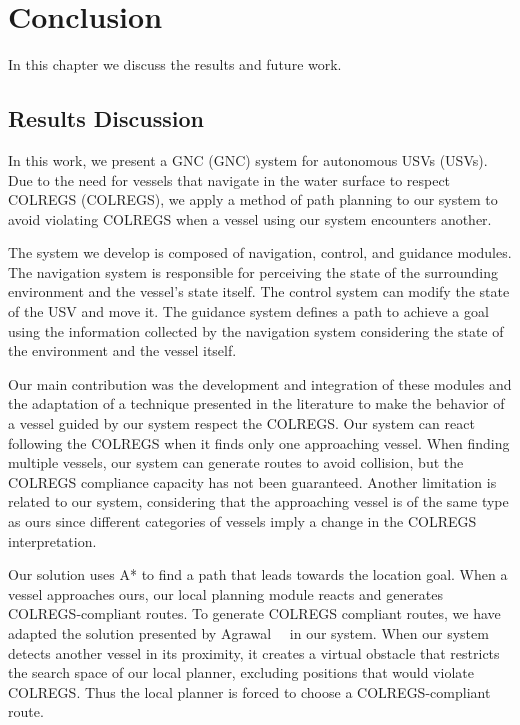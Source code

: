 \chapter{Conclusion}
\label{chap:6_Conclusion}

    In this chapter we discuss the results and future work.
    
    \section{Results Discussion}

    In this work, we present a \acl{GNC} (\ac{GNC}) system for autonomous \aclp{USV} (\acp{USV}). Due to the need for vessels that navigate in the water surface to respect \acl{COLREGS} (\ac{COLREGS}), we apply a method of path planning to our system to avoid violating \ac{COLREGS} when a vessel using our system encounters another.

    The system we develop is composed of navigation, control, and guidance modules. The navigation system is responsible for perceiving the state of the surrounding environment and the vessel's state itself. The control system can modify the state of the \ac{USV} and move it. The guidance system defines a path to achieve a goal using the information collected by the navigation system considering the state of the environment and the vessel itself.
    
    Our main contribution was the development and integration of these modules and the adaptation of a technique presented in the literature to make the behavior of a vessel guided by our system respect the \ac{COLREGS}. Our system can react following the \ac{COLREGS} when it finds only one approaching vessel. When finding multiple vessels, our system can generate routes to avoid collision, but the \ac{COLREGS} compliance capacity has not been guaranteed. Another limitation is related to our system, considering that the approaching vessel is of the same type as ours since different categories of vessels imply a change in the \ac{COLREGS} interpretation.
    
    Our solution uses A* to find a path that leads towards the location goal. When a vessel approaches ours, our local planning module reacts and generates \ac{COLREGS}-compliant routes. To generate \ac{COLREGS} compliant routes, we have adapted the solution presented by Agrawal~\etal~\cite{Agrawal2015COLREGS} in our system. When our system detects another vessel in its proximity, it creates a virtual obstacle that restricts the search space of our local planner, excluding positions that would violate \ac{COLREGS}. Thus the local planner is forced to choose a \ac{COLREGS}-compliant route.

